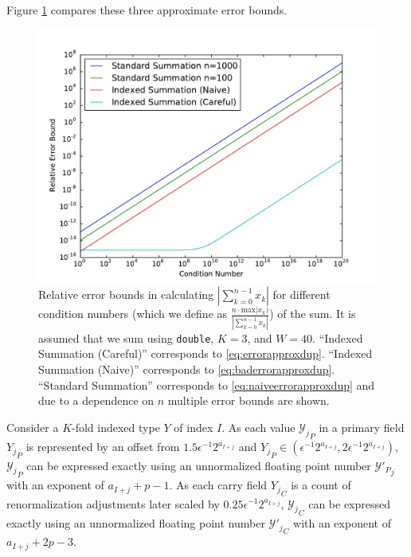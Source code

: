 \documentclass[12pt]{article}
\providecommand{\max}{\ensuremath{\text{max}}}
\theoremstyle{definition}
\numberwithin{equation}{section}
\numberwithin{figure}{section}
\begin{document}
    Figure \ref{fig:conversionmotivation} compares these three approximate error bounds.

\begin{figure}[H]
\begin{center}
\includegraphics[width=\textwidth]{plots/errorcomparison.pdf}
\caption{Relative error bounds in calculating $|\sum \limits_{k = 0}^{n - 1} x_k|$ for different condition numbers (which we define as $\frac{n \cdot \max |x_k)}{|\sum \limits_{k = 0}^{n - 1} x_k|}$) of the sum. It is assumed that we sum using \texttt{double}, $K = 3$, and $W = 40$. ``Indexed Summation (Careful)'' corresponds to \eqref{eq:errorapproxdup}. ``Indexed Summation (Naive)'' corresponds to \eqref{eq:baderrorapproxdup}. ``Standard Summation'' corresponds to \eqref{eq:naiveerrorapproxdup} and due to a dependence on $n$ multiple error bounds are shown.}
\label{fig:conversionmotivation}
\end{center}
\end{figure}

    Consider a $K$-fold indexed type $Y$ of index $I$.
    As each value ${\mathcal{Y}_j}_P$ in a primary field ${Y_j}_P$ is represented by an offset from $1.5  \epsilon^{-1}  2^{a_{I + j}}$ and ${Y_j}_P \in (\epsilon^{-1}  2^{a_{I + j}}, 2  \epsilon^{-1}  2^{a_{I + j}})$, ${\mathcal{Y}_j}_P$ can be expressed exactly using an unnormalized floating point number ${\mathcal{Y}'_P}_j$ with an exponent of $a_{I + j} + p - 1$.
    As each carry field ${Y_j}_C$ is a count of renormalization adjustments later scaled by $0.25  \epsilon^{-1}  2^{a_{I + j}}$, ${\mathcal{Y}_j}_C$ can be expressed exactly using an unnormalized floating point number ${\mathcal{Y}'_j}_C$ with an exponent of $a_{I + j} + 2  p - 3$.
\end{document}
